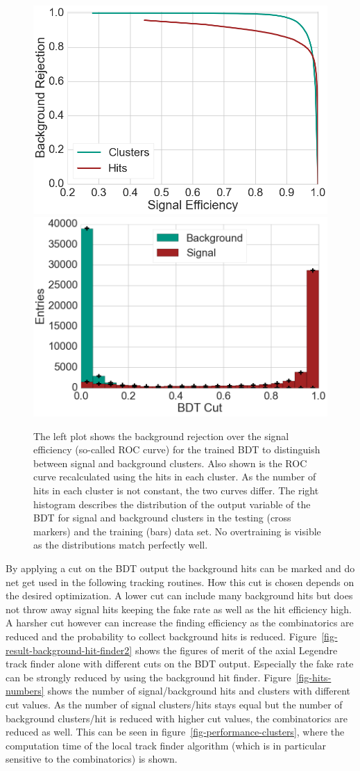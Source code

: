\begin{figure}
  \centering
  \includegraphics[width=0.48\linewidth]{figures/workflow/background_hit_finder_roc.png}
  \includegraphics[width=0.48\linewidth]{figures/workflow/background_hit_finder_overtraining.png}
  \caption{The left plot shows the background rejection over the signal efficiency (so-called ROC curve) for the trained BDT to distinguish between signal and background clusters. Also shown is the ROC curve recalculated using the hits in each cluster. As the number of hits in each cluster is not constant, the two curves differ. The right histogram describes the distribution of the output variable of the BDT for signal and background clusters in the testing (cross markers) and the training (bars) data set. No overtraining is visible as the distributions match perfectly well.}
  \label{fig-result-background-hit-finder}
\end{figure}

By applying a cut on the BDT output the background hits can be marked and do net get used in the following tracking routines. How this cut is chosen depends on the desired optimization. A lower cut can include many background hits but does not throw away signal hits keeping the fake rate as well as the hit efficiency high. A harsher cut however can increase the finding efficiency as the combinatorics are reduced and the probability to collect background hits is reduced. Figure~\ref{fig-result-background-hit-finder2} shows the figures of merit of the axial Legendre track finder alone with different cuts on the BDT output. Especially the fake rate can be strongly reduced by using the background hit finder. Figure~\ref{fig-hits-numbers} shows the number of signal/background hits and clusters with different cut values. As the number of signal clusters/hits stays equal but the number of background clusters/hit is reduced with higher cut values, the combinatorics are reduced as well. This can be seen in figure~\ref{fig-performance-clusters}, where the computation time of the local track finder algorithm (which is in particular sensitive to the combinatorics) is shown.

